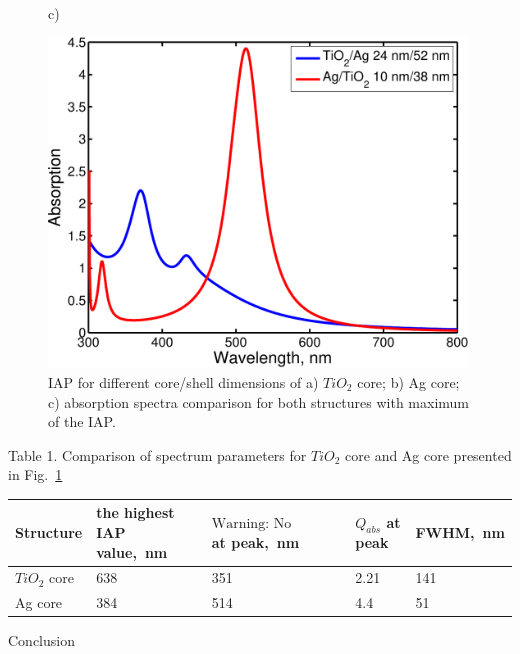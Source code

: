 \documentclass[aip,jap,reprint]{revtex4-1}
\begin{document}
\begin{figure}[!h]
\begin{minipage}[h]{0.47\textwidth}
  \end{minipage}\\
  \vspace{4pt}
  \begin{minipage}[h]{0.47\textwidth}
    \begin{flushleft}
      c)
    \end{flushleft}
  \end{minipage}
  \begin{minipage}[h]{0.47\textwidth}
    \includegraphics[width=0.99\textwidth]{compar}
  \end{minipage}%
  \caption{IAP for different core/shell
dimensions of a) $TiO_2$ core; b) Ag core; c) absorption spectra
comparison for both structures with maximum of the IAP.\label{fig:integral}}%
\end{figure}

Table 1. Comparison of spectrum parameters for $TiO_2$ core and Ag core
presented in Fig.~\ref{fig:integral}

\begin{flushleft}
\tablehead{}
\begin{supertabular}{|m{1.2191598in}|m{1.2191598in}|m{1.2191598in}|m{1.2191598in}|m{1.2198598in}|}
\hline
Structure &
the highest IAP value,~nm &
 $\text{Warning: No StarMath annotation}$ at peak,~nm &
$Q_{abs}$ at peak &
FWHM,~nm\\\hline
$TiO_2$ core &
638 &
351 &
2.21 &
141\\\hline
Ag core &
384 &
514 &
4.4 &
51\\\hline
\end{supertabular}
\end{flushleft}
Conclusion
\end{document}
